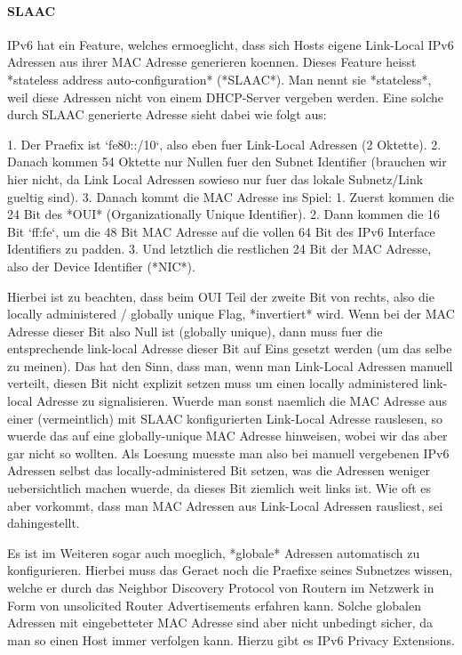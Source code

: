 \paragraph{SLAAC} 

IPv6 hat ein Feature, welches ermoeglicht, dass sich Hosts eigene Link-Local
IPv6 Adressen aus ihrer MAC Adresse generieren koennen. Dieses Feature heisst
*stateless address auto-configuration* (*SLAAC*). Man nennt sie *stateless*,
weil diese Adressen nicht von einem DHCP-Server vergeben werden. Eine solche
durch SLAAC generierte Adresse sieht dabei wie folgt aus:

1. Der Praefix ist `fe80::/10`, also eben fuer Link-Local Adressen (2 Oktette).
2. Danach kommen 54 Oktette nur Nullen fuer den Subnet Identifier (brauchen wir
   hier nicht, da Link Local Adressen sowieso nur fuer das lokale Subnetz/Link
   gueltig sind).
3. Danach kommt die MAC Adresse ins Spiel:
   1. Zuerst kommen die 24 Bit des *OUI* (Organizationally Unique
      Identifier).
   2. Dann kommen die 16 Bit `ff:fe`, um die 48 Bit MAC Adresse auf die vollen
      64 Bit des IPv6 Interface Identifiers zu padden.
   3. Und letztlich die restlichen 24 Bit der MAC Adresse, also der Device
      Identifier (*NIC*).

Hierbei ist zu beachten, dass beim OUI Teil der zweite Bit von rechts, also die
locally administered / globally unique Flag, *invertiert* wird. Wenn bei der MAC
Adresse dieser Bit also Null ist (globally unique), dann muss fuer die
entsprechende link-local Adresse dieser Bit auf Eins gesetzt werden (um das
selbe zu meinen). Das hat den Sinn, dass man, wenn man Link-Local Adressen
manuell verteilt, diesen Bit nicht explizit setzen muss um einen locally
administered link-local Adresse zu signalisieren. Wuerde man sonst naemlich die
MAC Adresse aus einer (vermeintlich) mit SLAAC konfigurierten Link-Local Adresse
rauslesen, so wuerde das auf eine globally-unique MAC Adresse hinweisen, wobei
wir das aber gar nicht so wollten. Als Loesung muesste man also bei manuell
vergebenen IPv6 Adressen selbst das locally-administered Bit setzen, was die
Adressen weniger uebersichtlich machen wuerde, da dieses Bit ziemlich weit links
ist. Wie oft es aber vorkommt, dass man MAC Adressen aus Link-Local Adressen
rausliest, sei dahingestellt.

Es ist im Weiteren sogar auch moeglich, *globale* Adressen automatisch zu
konfigurieren. Hierbei muss das Geraet noch die Praefixe seines Subnetzes
wissen, welche er durch das Neighbor Discovery Protocol von Routern im Netzwerk
in Form von unsolicited Router Advertisements erfahren kann. Solche globalen
Adressen mit eingebetteter MAC Adresse sind aber nicht unbedingt sicher, da man
so einen Host immer verfolgen kann. Hierzu gibt es IPv6 Privacy Extensions.

